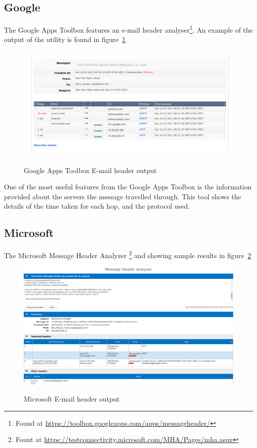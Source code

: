 \subsection{Google}

The Google Apps Toolbox features an e-mail header analyser\footnote{Found at
	\url{https://toolbox.googleapps.com/apps/messageheader/}}. An example
of the output of the utility is found in figure~\ref{fig:goo}.

\begin{figure} \centering %
	\includegraphics[width=0.8\linewidth]{google-header} \label{fig:goo}
	\caption{Google Apps Toolbox E-mail header output} \end{figure}

One of the most useful features from the Google Apps Toolbox is the information
provided about the servers the message travelled through.  This tool shows the
details of the time taken for each hop, and the protocol used.  

\subsection{Microsoft}

The Microsoft Message Header Analyzer \footnote{Fount at
	\url{https://testconnectivity.microsoft.com/MHA/Pages/mha.aspx}} and
showing sample results in figure~\ref{fig:mic}

\begin{figure} \centering
	\includegraphics[width=0.8\linewidth]{microsoft-header} \label{fig:mic}
	\caption{Microsoft E-mail header output} \end{figure}

